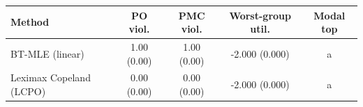 \begin{tabular}{lcccc}
\hline
Method & PO viol. & PMC viol. & Worst-group util. & Modal top \\
\hline
BT-MLE (linear) & 1.00 (0.00) & 1.00 (0.00) & -2.000 (0.000) & a \\
Leximax Copeland (LCPO) & 0.00 (0.00) & 0.00 (0.00) & -2.000 (0.000) & a \\
\hline
\end{tabular}
